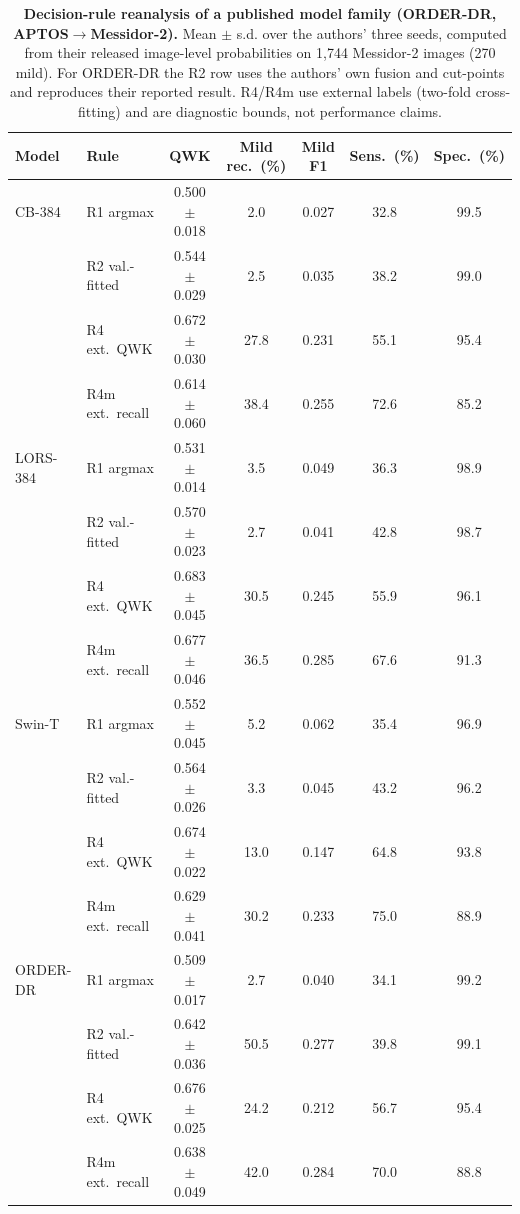 \begin{table}[t]
\caption{\textbf{Decision-rule reanalysis of a published model family (ORDER-DR,
APTOS$\rightarrow$Messidor-2).} Mean $\pm$ s.d. over the authors' three seeds, computed
from their released image-level probabilities on 1,744 Messidor-2 images
(270 mild). For ORDER-DR the R2 row uses the authors' own fusion and cut-points
and reproduces their reported result. R4/R4m use external labels (two-fold cross-fitting)
and are diagnostic bounds, not performance claims.}\label{tab:orderdr}
\centering\scriptsize\setlength{\tabcolsep}{3pt}
\begin{tabular}{@{}llccccc@{}}
\toprule
Model & Rule & QWK & Mild rec.\ (\%) & Mild F1 & Sens.\ (\%) & Spec.\ (\%) \\
\midrule
CB-384 & R1 argmax & 0.500 $\pm$ 0.018 & 2.0 & 0.027 & 32.8 & 99.5 \\
 & R2 val.-fitted & 0.544 $\pm$ 0.029 & 2.5 & 0.035 & 38.2 & 99.0 \\
 & R4 ext.\ QWK & 0.672 $\pm$ 0.030 & 27.8 & 0.231 & 55.1 & 95.4 \\
 & R4m ext.\ recall & 0.614 $\pm$ 0.060 & 38.4 & 0.255 & 72.6 & 85.2 \\
\addlinespace
LORS-384 & R1 argmax & 0.531 $\pm$ 0.014 & 3.5 & 0.049 & 36.3 & 98.9 \\
 & R2 val.-fitted & 0.570 $\pm$ 0.023 & 2.7 & 0.041 & 42.8 & 98.7 \\
 & R4 ext.\ QWK & 0.683 $\pm$ 0.045 & 30.5 & 0.245 & 55.9 & 96.1 \\
 & R4m ext.\ recall & 0.677 $\pm$ 0.046 & 36.5 & 0.285 & 67.6 & 91.3 \\
\addlinespace
Swin-T & R1 argmax & 0.552 $\pm$ 0.045 & 5.2 & 0.062 & 35.4 & 96.9 \\
 & R2 val.-fitted & 0.564 $\pm$ 0.026 & 3.3 & 0.045 & 43.2 & 96.2 \\
 & R4 ext.\ QWK & 0.674 $\pm$ 0.022 & 13.0 & 0.147 & 64.8 & 93.8 \\
 & R4m ext.\ recall & 0.629 $\pm$ 0.041 & 30.2 & 0.233 & 75.0 & 88.9 \\
\addlinespace
ORDER-DR & R1 argmax & 0.509 $\pm$ 0.017 & 2.7 & 0.040 & 34.1 & 99.2 \\
 & R2 val.-fitted & 0.642 $\pm$ 0.036 & 50.5 & 0.277 & 39.8 & 99.1 \\
 & R4 ext.\ QWK & 0.676 $\pm$ 0.025 & 24.2 & 0.212 & 56.7 & 95.4 \\
 & R4m ext.\ recall & 0.638 $\pm$ 0.049 & 42.0 & 0.284 & 70.0 & 88.8 \\
\bottomrule
\end{tabular}
\end{table}
